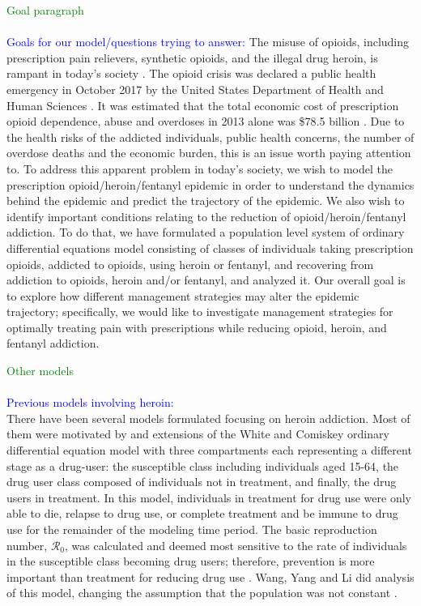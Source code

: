\documentclass[12pt]{article}
\begin{document}
\textcolor{green}{Goal paragraph} \\ \\
\textcolor{blue}{Goals for our model/questions trying to answer:}
The misuse of opioids, including prescription pain relievers, synthetic opioids, and the illegal drug heroin, is rampant in today's society \cite{NIH2}. The opioid crisis was declared a public health emergency in October 2017 by the United States Department of Health and Human Sciences \cite{HHS1}. It was estimated that the total economic cost of prescription opioid dependence, abuse and overdoses in 2013 alone was \$78.5 billion \cite{Florence}. Due to the health risks of the addicted individuals, public health concerns, the number of overdose deaths and the economic burden, this is an issue worth paying attention to.
To address this apparent problem in today's society, we wish to model the prescription opioid/heroin/fentanyl epidemic in order to understand the dynamics behind the epidemic and predict the trajectory of the epidemic. We also wish to identify important conditions relating to the reduction of opioid/heroin/fentanyl addiction. To do that, we have formulated a population level system of ordinary differential equations model consisting of classes of individuals taking prescription opioids, addicted to opioids, using heroin or fentanyl, and recovering from addiction to opioids, heroin and/or fentanyl, and analyzed it. Our overall goal is to explore how different management strategies may alter the epidemic trajectory; specifically, we would like to investigate management strategies for optimally treating pain with prescriptions while reducing opioid, heroin, and fentanyl addiction.

\textcolor{green}{Other models} \\ \\
\textcolor{blue}{Previous models involving heroin:} \\
There have been several models formulated focusing on heroin addiction. Most of them were motivated by and extensions of the White and Comiskey ordinary differential equation model with three compartments each representing a different stage as a drug-user: the susceptible class including individuals aged 15-64, the drug user class composed of individuals not in treatment, and finally, the drug users in treatment. In this model, individuals in treatment for drug use were only able to die, relapse to drug use, or complete treatment and be immune to drug use for the remainder of the modeling time period. The basic reproduction number, $\mathscr{R}_0$, was calculated and deemed most sensitive to the rate of individuals in the susceptible class becoming drug users; therefore, prevention is more important than treatment for reducing drug use \cite{White}. Wang, Yang and Li did analysis of this model, changing the assumption that the population was not constant \cite{Wang}. 
\end{document}
